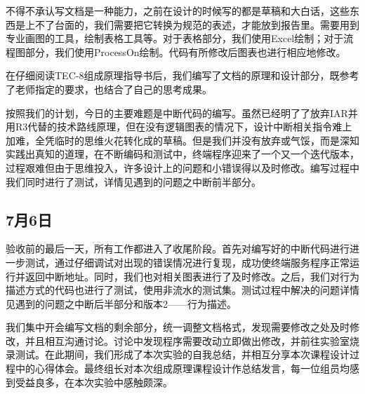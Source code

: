 \documentclass[lang=cn,11pt,a4paper,cite=authornum]{paper}
\begin{document}
不得不承认写文档是一种能力，之前在设计的时候写的都是草稿和大白话，这些东西是上不了台面的，我们需要把它转换为规范的表述，才能放到报告里。需要用到专业画图的工具，绘制表格工具等。对于表格部分，我们使用Excel绘制；对于流程图部分，我们使用ProcessOn绘制。代码有所修改后图表也进行相应地修改。

在仔细阅读TEC-8组成原理指导书后，我们编写了文档的原理和设计部分，既参考了老师指定的要求，也结合了自己的思考成果。

按照我们的计划，今日的主要难题是中断代码的编写。虽然已经明了了放弃IAR并用R3代替的技术路线原理，但在没有逻辑图表的情况下，设计中断相关指令难上加难，全凭临时的思维火花转化成的草稿。但是我们并没有放弃或气馁，而是深知实践出真知的道理，在不断编码和测试中，终端程序迎来了一个又一个迭代版本，过程艰难但由于思维投入，许多设计上的问题和小错误得以及时修改。编写过程中我们同时进行了测试，详情见遇到的问题之中断前半部分。

\subsection{7月6日}

验收前的最后一天，所有工作都进入了收尾阶段。首先对编写好的中断代码进行进一步测试，通过仔细调试对出现的错误情况进行复现，成功使终端服务程序正常运行并返回中断地址。同时，我们也对相关图表进行了及时修改。之后，我们对行为描述方式的代码也进行了测试，使用非流水的测试集。测试过程中解决的问题详情见遇到的问题之中断后半部分和版本2——行为描述。

我们集中开会编写文档的剩余部分，统一调整文档格式，发现需要修改之处及时修改，并且相互沟通讨论。讨论中发现程序需要改动立即做出修改，并前往实验室烧录测试。在此期间，我们形成了本次实验的自我总结，并相互分享本次课程设计过程中的心得体会。最终组长对本次组成原理课程设计作总结发言，每一位组员均感到受益良多，在本次实验中感触颇深。
\end{document}
